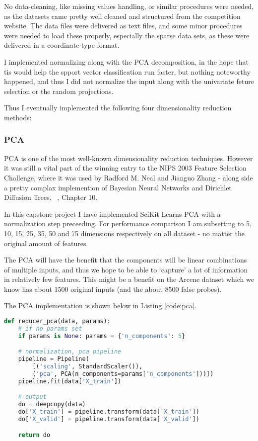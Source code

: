 \documentclass[12pt]{article}
\begin{document}
No data-cleaning, like missing values handling, or similar procedures were needed, as the datasets came pretty well cleaned and structured from the competition website. The data files were delivered as text files, and some minor procedures were needed to load these properly, especially the sparse data sets, as these were delivered in a coordinate-type format.

I implemented normalizing along with the PCA decomposition, in the hope that tis would help the spport vector classification run faster, but nothing noteworthy happened, and thus I did not normalize the input along with the univariate feture selection or the random projections.

Thus I eventually implemented the following four dimensionality reduction methods:

\subsubsection{PCA}

PCA is one of the most well-known dimensionality reduction techniques. However it was still a vital part of the winning entry to the NIPS 2003 Feature Selection Challenge, where it was used by Radford M. Neal and Jianguo Zhang - along side a pretty complax implemention of Bayesian Neural Networks and Dirichlet Diffusion Trees, ~\cite{nips03book}, Chapter 10.

In this capstone project I have implemented SciKit Learns PCA with a normalization step preceeding. For performance comparison I am subsetting to 5, 10, 15, 25, 35, 50 and 75 dimensions respectively on all dataset - no matter the original amount of features.

The PCA will have the benefit that the components will be linear combinations of multiple inputs, and thus we hope to be able to `capture' a lot of information in relatively few features. This might be a benefit on the Arcene dataset which we know has about 1500 original inputs (and the about 8500 false probes). 

The PCA implementation is shown below in Listing \ref{code:pca}.

\begin{lstlisting}[language=python,frame=single,caption=PCA Implementation, label=code:pca]
def reducer_pca(data, params):
    # if no params set
    if params is None: params = {'n_components': 5}

    # normalization, pca pipeline
    pipeline = Pipeline(
        [('scaling', StandardScaler()), 
        ('pca', PCA(n_components=params['n_components']))])
    pipeline.fit(data['X_train'])

    # output
    do = deepcopy(data)
    do['X_train'] = pipeline.transform(data['X_train'])
    do['X_valid'] = pipeline.transform(data['X_valid'])

    return do
\end{lstlisting}
\end{document}
